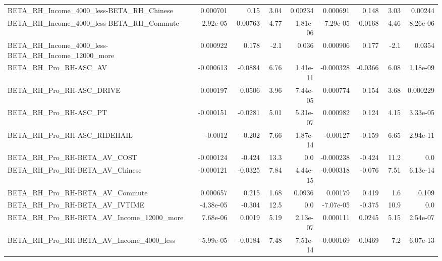 \begin{tabular}{lrrrrrrrr}
BETA\_RH\_Income\_4000\_less-BETA\_RH\_Chinese           &    0.000701 &         0.15 &      3.04 &  0.00234 &   0.000691 &       0.148 &         3.03 &       0.00244 \\
BETA\_RH\_Income\_4000\_less-BETA\_RH\_Commute           &   -2.92e-05 &     -0.00763 &     -4.77 & 1.81e-06 &  -7.29e-05 &     -0.0168 &        -4.46 &      8.26e-06 \\
BETA\_RH\_Income\_4000\_less-BETA\_RH\_Income\_12000\_more &    0.000922 &        0.178 &      -2.1 &    0.036 &   0.000906 &       0.177 &         -2.1 &        0.0354 \\
BETA\_RH\_Pro\_RH-ASC\_AV                              &   -0.000613 &      -0.0884 &      6.76 & 1.41e-11 &  -0.000328 &     -0.0366 &         6.08 &      1.18e-09 \\
BETA\_RH\_Pro\_RH-ASC\_DRIVE                           &    0.000197 &       0.0506 &      3.96 & 7.44e-05 &   0.000774 &       0.154 &         3.68 &      0.000229 \\
BETA\_RH\_Pro\_RH-ASC\_PT                              &   -0.000151 &      -0.0281 &      5.01 & 5.31e-07 &   0.000982 &       0.124 &         4.15 &      3.33e-05 \\
BETA\_RH\_Pro\_RH-ASC\_RIDEHAIL                        &     -0.0012 &       -0.202 &      7.66 & 1.87e-14 &   -0.00127 &      -0.159 &         6.65 &      2.94e-11 \\
BETA\_RH\_Pro\_RH-BETA\_AV\_COST                        &   -0.000124 &       -0.424 &      13.3 &      0.0 &  -0.000238 &      -0.424 &         11.2 &           0.0 \\
BETA\_RH\_Pro\_RH-BETA\_AV\_Chinese                     &   -0.000121 &      -0.0325 &      7.84 & 4.44e-15 &  -0.000318 &      -0.076 &         7.51 &      6.13e-14 \\
BETA\_RH\_Pro\_RH-BETA\_AV\_Commute                     &    0.000657 &        0.215 &      1.68 &   0.0936 &    0.00179 &       0.419 &          1.6 &         0.109 \\
BETA\_RH\_Pro\_RH-BETA\_AV\_IVTIME                      &   -4.38e-05 &       -0.304 &      12.5 &      0.0 &  -7.07e-05 &      -0.375 &         10.9 &           0.0 \\
BETA\_RH\_Pro\_RH-BETA\_AV\_Income\_12000\_more           &    7.68e-06 &       0.0019 &      5.19 & 2.13e-07 &   0.000111 &      0.0245 &         5.15 &      2.54e-07 \\
BETA\_RH\_Pro\_RH-BETA\_AV\_Income\_4000\_less            &   -5.99e-05 &      -0.0184 &      7.48 & 7.51e-14 &  -0.000169 &     -0.0469 &          7.2 &      6.07e-13 \\

\end{tabular}
